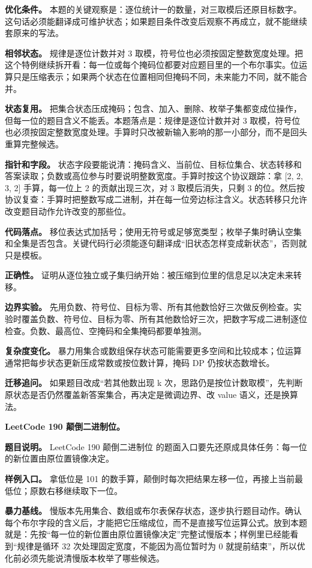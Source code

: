 \textbf{优化条件。} 本题的关键观察是：逐位统计一的数量，对三取模后还原目标数字。这句话必须能翻译成可维护状态；如果题目条件改变后观察不再成立，就不能继续套原来的写法。

\textbf{相邻状态。} 规律是逐位计数并对 3 取模，符号位也必须按固定整数宽度处理。把这个特例继续拆开看：每一位或每个掩码位都要对应题目里的一个布尔事实。位运算只是压缩表示；如果两个状态在位置相同但掩码不同，未来能力不同，就不能合并。

\textbf{状态复用。} 把集合状态压成掩码；包含、加入、删除、枚举子集都变成位操作，但每一位的题目含义不能丢。本题落点是：规律是逐位计数并对 3 取模，符号位也必须按固定整数宽度处理。手算时只改被新输入影响的那一小部分，而不是回头重算完整候选。

\textbf{指针和字段。} 状态字段要能说清：掩码含义、当前位、目标位集合、状态转移和答案读取；负数或高位参与时要说明整数宽度。手算时按这个协议跟踪：拿 [2, 2, 3, 2] 手算，每一位上 2 的贡献出现三次，对 3 取模后消失，只剩 3 的位。然后按协议复查：手算时把整数写成二进制，并在每一位旁边标注含义。状态转移只允许改变题目动作允许改变的那些位。

\textbf{代码落点。} 移位表达式加括号；使用无符号或足够宽类型；枚举子集时确认空集和全集是否包含。关键代码行必须能逐句翻译成“旧状态怎样变成新状态”，否则就只是模板。

\textbf{正确性。} 证明从逐位独立或子集归纳开始：被压缩到位里的信息足以决定未来转移。

\textbf{边界实验。} 先用负数、符号位、目标为零、所有其他数恰好三次做反例检查。实验时覆盖负数、符号位、目标为零、所有其他数恰好三次，把数字写成二进制逐位检查。负数、最高位、空掩码和全集掩码都要单独测。

\textbf{复杂度变化。} 暴力用集合或数组保存状态可能需要更多空间和比较成本；位运算通常把每步状态更新压成常数或按位数计算，掩码 DP 仍按状态数增长。

\textbf{迁移追问。} 如果题目改成“若其他数出现 k 次，思路仍是按位计数取模”，先判断原状态是否仍然覆盖新答案集合，再决定是微调边界、改 value 语义，还是换算法。

\noindent\textbf{LeetCode 190 颠倒二进制位。}

\textbf{题目说明。} LeetCode 190 颠倒二进制位 的题面入口要先还原成具体任务：每一位的新位置由原位置镜像决定。

\textbf{样例入口。} 拿低位是 101 的数手算，颠倒时每次把结果左移一位，再接上当前最低位；原数右移继续取下一位。

\textbf{暴力基线。} 慢版本先用集合、数组或布尔表保存状态，逐步执行题目动作。确认每个布尔字段的含义后，才能把它压缩成位，而不是直接写位运算公式。放到本题就是：先按“每一位的新位置由原位置镜像决定”完整试慢版本；样例里已经能看到“规律是循环 32 次处理固定宽度，不能因为高位暂时为 0 就提前结束”，所以优化前必须先能说清慢版本枚举了哪些候选。

